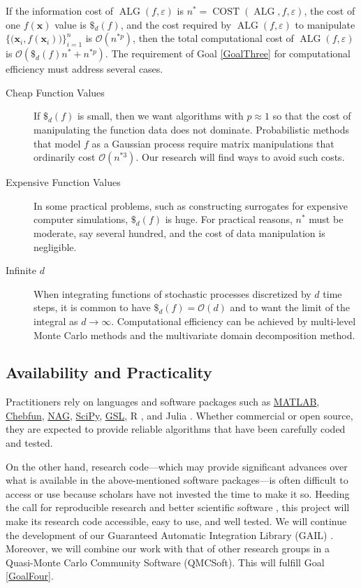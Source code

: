 \documentclass[11pt]{NSFamsart}
\newcommand{\SciPy}{\hyperlink{SciPylink}{SciPy}\xspace}
\newcommand{\GSL}{\hyperlink{GSLlink}{GSL}\xspace}
\newcommand{\NAG}{\hyperlink{NAGlink}{NAG}\xspace}
\newcommand{\MATLAB}{\hyperlink{MATLABlink}{MATLAB}\xspace}
\newcommand{\Chebfun}{\hyperlink{Chebfunlink}{Chebfun}\xspace}
\DeclareMathOperator{\cost}{COST}
\DeclareMathOperator{\ALG}{ALG}
\newcommand{\bx}{{\boldsymbol{x}}}
\newcommand{\Order}{\mathcal{O}}
\newcommand{\dataN}{\bigl\{\bigl(\bx_i,f(\bx_i)\bigr)\bigr\}_{i=1}^n}
\begin{document}
If the information cost of $\ALG(f,\varepsilon)$ is $n^* = \cost(\ALG,f,\varepsilon)$, the cost of one $f(\bx)$ value is $\$_d(f)$, and the cost required by $\ALG(f,\varepsilon)$ to manipulate $\dataN$ is $\Order(n^{*p})$, then the total computational cost of $\ALG(f,\varepsilon)$ is $ \Order(\$_d(f)n^* + n^{*p})$.
The requirement of Goal \ref{GoalThree} for computational efficiency must address several cases.  
\begin{description}

\item[Cheap Function Values]  If $\$_d(f)$ is small, then we want algorithms with $p \approx 1$ so that the cost of manipulating the function data does not dominate.  Probabilistic methods that model $f$ as a Gaussian process require matrix manipulations that ordinarily cost $\Order( n^{*3})$.  Our research will find ways to avoid such costs.

    \item[Expensive Function Values] In some practical  problems, such as constructing surrogates for expensive computer simulations,  $\$_d(f)$ is huge.  For practical reasons, $n^*$ must be moderate, say several hundred, and the cost of data manipulation is negligible.
    
    \item[Infinite $d$] When integrating functions of stochastic processes discretized by $d$ time steps, it is common to have $\$_d(f) = \Order(d)$ and to want the limit of the integral as $d \to \infty$.  Computational efficiency can be achieved by multi-level Monte Carlo methods and the multivariate domain decomposition method.  
\end{description}

\subsection{Availability and Practicality} \label{sec:AvailPract}

Practitioners rely on languages and software packages such as \MATLAB, \Chebfun, \NAG, \SciPy, \GSL, \hypertarget{Rlink}{R} \cite{R3.5.1_2018}, and \hypertarget{Julialink}{Julia} \cite{Julia1.0}. Whether commercial or open source, they are expected to provide reliable algorithms that have been carefully coded and tested.  

On the other hand, research code---which may provide significant advances over what is available in the above-mentioned software packages---is often difficult to access or use because scholars have not invested the time to make it so.  Heeding the call for reproducible research \cite{BaiBor12a, Pen11, Sto14a} and better scientific software \cite{BSS18}, this project will make its research code accessible, easy to use, and well tested.  We will continue the development of our Guaranteed Automatic Integration Library \hypertarget{GAILlink}{(GAIL)} \cite{ChoEtal17b}.  Moreover, we will combine our work with that of other research groups in a Quasi-Monte Carlo Community Software \hypertarget{QMCSoftlink}{(QMCSoft)}.  This will fulfill Goal \ref{GoalFour}.
\end{document}
